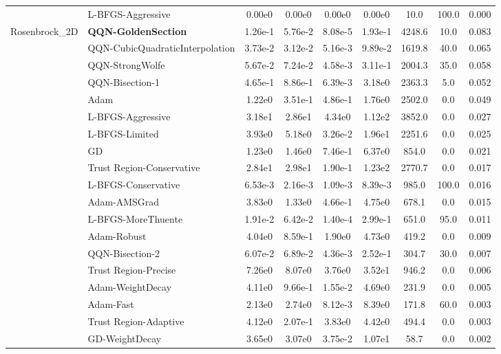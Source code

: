 \documentclass[10pt]{article}
\begin{document}
\begin{longtable}{|l|l|c|c|c|c|c|c|c|}
\hline
 & L-BFGS-Aggressive & 0.00e0 & 0.00e0 & 0.00e0 & 0.00e0 & 10.0 & 100.0 & 0.000 \\
Rosenbrock\_2D & \textbf{QQN-GoldenSection} & 1.26e-1 & 5.76e-2 & 8.08e-5 & 1.93e-1 & 4248.6 & 10.0 & 0.083 \\
\hline
 & QQN-CubicQuadraticInterpolation & 3.73e-2 & 3.12e-2 & 5.16e-3 & 9.89e-2 & 1619.8 & 40.0 & 0.065 \\
\hline
 & QQN-StrongWolfe & 5.67e-2 & 7.24e-2 & 4.58e-3 & 3.11e-1 & 2004.3 & 35.0 & 0.058 \\
\hline
 & QQN-Bisection-1 & 4.65e-1 & 8.86e-1 & 6.39e-3 & 3.18e0 & 2363.3 & 5.0 & 0.052 \\
\hline
 & Adam & 1.22e0 & 3.51e-1 & 4.86e-1 & 1.76e0 & 2502.0 & 0.0 & 0.049 \\
\hline
 & L-BFGS-Aggressive & 3.18e1 & 2.86e1 & 4.34e0 & 1.12e2 & 3852.0 & 0.0 & 0.027 \\
\hline
 & L-BFGS-Limited & 3.93e0 & 5.18e0 & 3.26e-2 & 1.96e1 & 2251.6 & 0.0 & 0.025 \\
\hline
 & GD & 1.23e0 & 1.46e0 & 7.46e-1 & 6.37e0 & 854.0 & 0.0 & 0.021 \\
\hline
 & Trust Region-Conservative & 2.84e1 & 2.98e1 & 1.90e-1 & 1.23e2 & 2770.7 & 0.0 & 0.017 \\
\hline
 & L-BFGS-Conservative & 6.53e-3 & 2.16e-3 & 1.09e-3 & 8.39e-3 & 985.0 & 100.0 & 0.016 \\
\hline
 & Adam-AMSGrad & 3.83e0 & 1.33e0 & 4.66e-1 & 4.75e0 & 678.1 & 0.0 & 0.015 \\
\hline
 & L-BFGS-MoreThuente & 1.91e-2 & 6.42e-2 & 1.40e-4 & 2.99e-1 & 651.0 & 95.0 & 0.011 \\
\hline
 & Adam-Robust & 4.04e0 & 8.59e-1 & 1.90e0 & 4.73e0 & 419.2 & 0.0 & 0.009 \\
\hline
 & QQN-Bisection-2 & 6.07e-2 & 6.89e-2 & 4.36e-3 & 2.52e-1 & 304.7 & 30.0 & 0.007 \\
\hline
 & Trust Region-Precise & 7.26e0 & 8.07e0 & 3.76e0 & 3.52e1 & 946.2 & 0.0 & 0.006 \\
\hline
 & Adam-WeightDecay & 4.11e0 & 9.66e-1 & 1.55e-2 & 4.69e0 & 231.9 & 0.0 & 0.005 \\
\hline
 & Adam-Fast & 2.13e0 & 2.74e0 & 8.12e-3 & 8.39e0 & 171.8 & 60.0 & 0.003 \\
\hline
 & Trust Region-Adaptive & 4.12e0 & 2.07e-1 & 3.83e0 & 4.42e0 & 494.4 & 0.0 & 0.003 \\
\hline
 & GD-WeightDecay & 3.65e0 & 3.07e0 & 3.75e-2 & 1.07e1 & 58.7 & 0.0 & 0.002 \\

\end{longtable}
\end{document}
